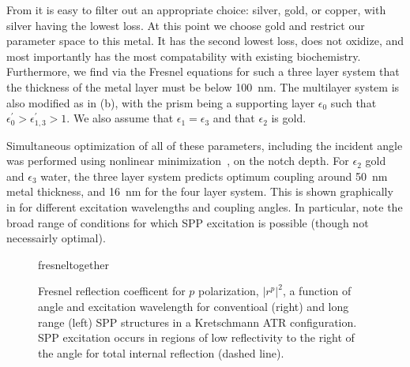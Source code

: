 From  it is easy to filter out an appropriate
choice: silver, gold, or copper, with silver having the lowest loss.  At
this point we choose gold and restrict our parameter space to this metal.
It has the second lowest loss, does not oxidize, and most importantly has
the most compatability with existing biochemistry.  Furthermore, we find
via the Fresnel equations for such a three layer system that the thickness
of the metal layer must be below \SI{100}{\nano\meter}.  The multilayer
system is also modified as in (b), with the
prism being a supporting layer $\epsilon_0$ such that
$\epsilon^\prime_0>\epsilon^\prime_{1,3}>1$.  We also assume that
$\epsilon_1=\epsilon_3$ and that $\epsilon_2$ is gold.

Simultaneous optimization of all of these parameters, including the
incident angle was performed using nonlinear
minimization~\cite{brent1973algorithms}, on the notch depth.  For
$\epsilon_2$ gold and $\epsilon_3$ water, the three layer system predicts
optimum coupling around \SI{50}{\nano\meter} metal thickness, and
\SI{16}{\nano\meter} for the four layer system.  This is shown graphically
in  for different excitation wavelengths and
coupling angles.  In particular, note the broad range of conditions for
which SPP excitation is possible (though not necessairly optimal).

\begin{figure}[ht]
\centering
{fresneltogether}
\caption{Fresnel reflection coefficent for $p$ polarization, $|r^p|^2$, a
function of angle and excitation wavelength for conventioal (right) and
long range (left) SPP structures in a Kretschmann ATR configuration.  SPP
excitation occurs in regions of low reflectivity to the right of the angle
for total internal reflection (dashed line).}
\label{fig:fresnelangle}
\end{figure}

